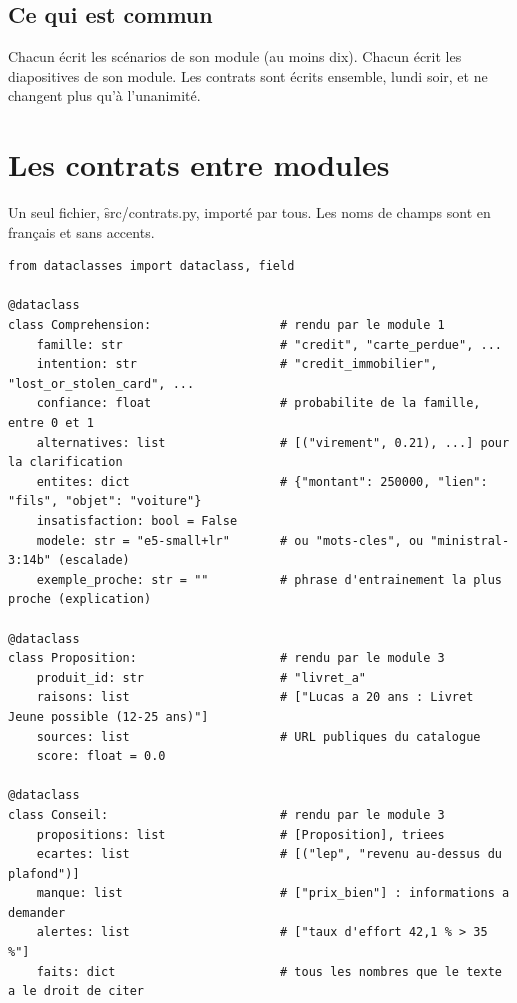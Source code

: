 \subsection{Ce qui est commun}

Chacun écrit les scénarios de son module (au moins dix). Chacun écrit les diapositives de son
module. Les contrats sont écrits ensemble, lundi soir, et ne changent plus qu'à l'unanimité.

\section{Les contrats entre modules}

Un seul fichier, \f{src/contrats.py}, importé par tous. Les noms de champs sont en français et sans
accents.

\begin{code}
\footnotesize
\begin{verbatim}
from dataclasses import dataclass, field

@dataclass
class Comprehension:                  # rendu par le module 1
    famille: str                      # "credit", "carte_perdue", ...
    intention: str                    # "credit_immobilier", "lost_or_stolen_card", ...
    confiance: float                  # probabilite de la famille, entre 0 et 1
    alternatives: list                # [("virement", 0.21), ...] pour la clarification
    entites: dict                     # {"montant": 250000, "lien": "fils", "objet": "voiture"}
    insatisfaction: bool = False
    modele: str = "e5-small+lr"       # ou "mots-cles", ou "ministral-3:14b" (escalade)
    exemple_proche: str = ""          # phrase d'entrainement la plus proche (explication)

@dataclass
class Proposition:                    # rendu par le module 3
    produit_id: str                   # "livret_a"
    raisons: list                     # ["Lucas a 20 ans : Livret Jeune possible (12-25 ans)"]
    sources: list                     # URL publiques du catalogue
    score: float = 0.0

@dataclass
class Conseil:                        # rendu par le module 3
    propositions: list                # [Proposition], triees
    ecartes: list                     # [("lep", "revenu au-dessus du plafond")]
    manque: list                      # ["prix_bien"] : informations a demander
    alertes: list                     # ["taux d'effort 42,1 % > 35 %"]
    faits: dict                       # tous les nombres que le texte a le droit de citer


\end{verbatim}
\end{code}
